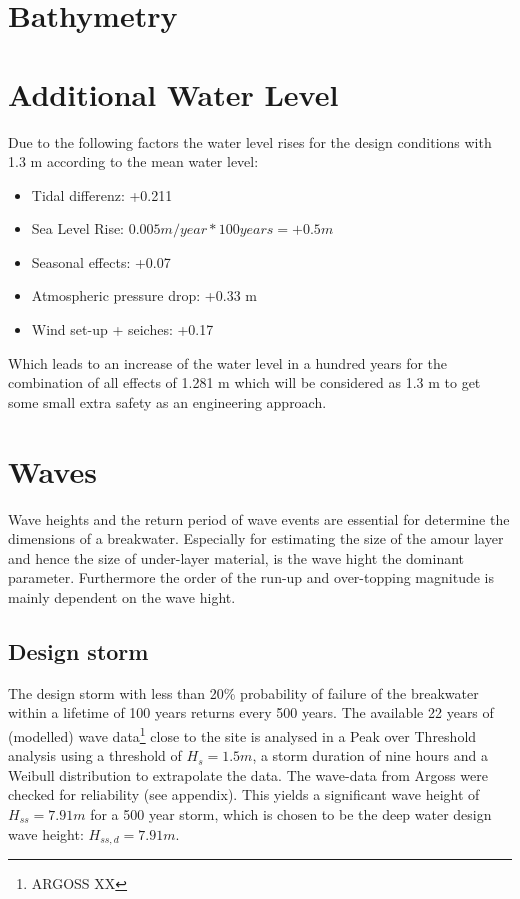 \section{Bathymetry}

\section{Additional Water Level}
Due to the following factors the water level rises for the design conditions with 1.3 m according to the mean water level:
\begin{itemize}
\item Tidal differenz: +0.211
\item Sea Level Rise: $0.005 m/year * 100 years = +0.5 m$
\item Seasonal effects: +0.07
\item Atmospheric pressure drop: +0.33 m
\item Wind set-up + seiches: +0.17	
\end{itemize}
Which leads to an increase of the water level in a hundred years for the combination of all effects of 1.281 m which will be considered as 1.3 m to get some small extra safety as an engineering approach.
\section{Waves}
Wave heights and the return period of wave events are essential for determine the dimensions of a breakwater. Especially for estimating the size of the amour layer and hence the size of under-layer material, is the wave hight the dominant parameter. Furthermore the order of the run-up and over-topping magnitude is mainly dependent on the wave hight.
\subsection{Design storm}
The design storm with less than 20\% probability of failure of the breakwater within a lifetime of 100 years returns every 500 years.
The available 22 years of (modelled) wave data\footnote{ARGOSS XX} close to the site is analysed in a Peak over Threshold analysis using a threshold of $H_s=1.5m$, a storm duration of nine hours and a Weibull distribution to extrapolate the data. The wave-data from Argoss were checked for reliability (see appendix).
This yields a significant wave height of $H_{ss}=7.91m$ for a 500 year storm, which is chosen to be the deep water design wave height: $H_{ss,d}=7.91m$.

